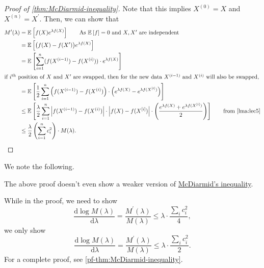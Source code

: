 \begin{proof}[Proof of \autoref{thm:McDiarmid-inequality}]
	Note that this implies \(X^{(0)} = X\) and \(X^{(n)} = X^{\prime} \). Then, we can show that
	\begin{align*}
		M^{\prime} (\lambda )
		 & = \mathbb{E}_{}\left[f(X) e^{\lambda f(X)} \right] \tag*{As \(\mathbb{E}_{}\left[f \right] = 0\) and \(X, X^{\prime} \) are independent}                                                                                                                                                     \\
		 & = \mathbb{E}_{}\left[\big(f(X) - f(X^{\prime} )\big) e^{\lambda f(X)}\right]                                                                                                                                                                                                                          \\
		 & = \mathbb{E}_{}\left[ \sum_{i=1}^{n} (f(X^{(i-1)}) - f(X^{(i)})) \cdot e^{\lambda f(X)}\right]                                                                                                                                                                                                        \\
		\intertext{if \(i^{\text{th} }\) position of \(X\) and \(X^{\prime} \) are swapped, then for the new data \(X^{(i-1)}\) and \(X^{(i)}\) will also be swapped,}
		 & = \mathbb{E}_{}\left[\frac{1}{2} \sum_{i=1}^{n} \left( f(X^{(i-1)}) - f(X^{(i)}) \right) \cdot \left( e^{\lambda f(X)} - e^{\lambda f(X^{[i]})} \right)  \right]                                                                                                                             \\
		 & \leq \mathbb{E}_{}\left[\frac{\lambda }{2} \sum_{i=1}^{n} \left\vert f(X^{(i-1)}) - f(X^{(i)}) \right\vert \cdot \left\vert f(X) - f(X^{[i]}) \right\vert \cdot \left( \frac{e^{\lambda f(X)} + e^{\lambda f(X^{[i]})}}{2} \right)  \right] \tag*{from \autoref{lma:lec5}} \\
		 & \leq \frac{\lambda}{2}\left( \sum_{i=1}^{n} c_i^2 \right) \cdot M(\lambda ).
	\end{align*}
\end{proof}

We note the following.

\begin{note}
	The above proof doesn't even show a weaker version of \hyperref[thm:McDiarmid-inequality]{McDiarmid's inequality}.
\end{note}
\begin{explanation}
	While in the proof, we need to show
	\[
		\frac{\mathrm{d}\log M(\lambda )}{\mathrm{d}\lambda } = \frac{M^{\prime} (\lambda )}{M(\lambda )} \leq \lambda \cdot \frac{\sum_{i} c_i^2}{4},
	\]
	we only show
	\[
		\frac{\mathrm{d}\log M(\lambda )}{\mathrm{d}\lambda } = \frac{M^{\prime} (\lambda )}{M(\lambda )} \leq \lambda \cdot \frac{\sum_{i} c_i^2}{2}.
	\]
	For a complete proof, see \autoref{pf-thm:McDiarmid-inequality}.
\end{explanation}

